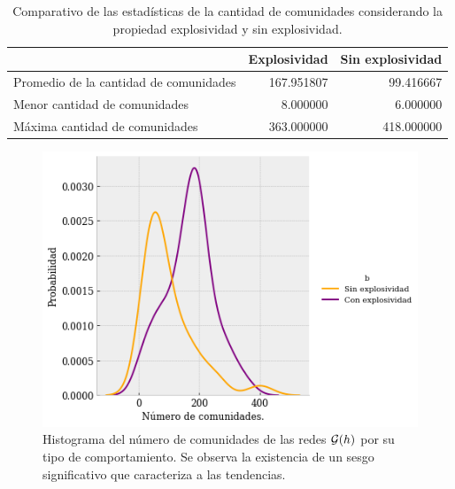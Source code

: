 \documentclass[../main.tex]{subfiles}
\begin{document}
% 


\begin{table}[]
    \centering
    \caption{Comparativo de las estadísticas de la cantidad de comunidades considerando la propiedad explosividad y sin explosividad.}
    \label{tab:resulatdos_comparativodecomunidades}
    \begin{tabular}{lrr}
\toprule
{} &  Explosividad &  Sin explosividad \\
\midrule
Promedio de la cantidad de comunidades  &    167.951807 &         99.416667 \\
Menor cantidad de  comunidades  &      8.000000 &          6.000000 \\
Máxima cantidad de comunidades   &    363.000000 &        418.000000 \\
\bottomrule
\end{tabular}
\end{table}




\begin{figure}
    \centering
    \includegraphics[scale = 0.6]{images/resultados_comparativocomunidades.png}
    \caption{Histograma del número de comunidades de las redes $\mathcal{G}(h)$ por su tipo de comportamiento. Se observa la existencia de un sesgo significativo que caracteriza a las tendencias.}
    \label{fig:resultados_lenComunidades}
\end{figure}
\end{document}
